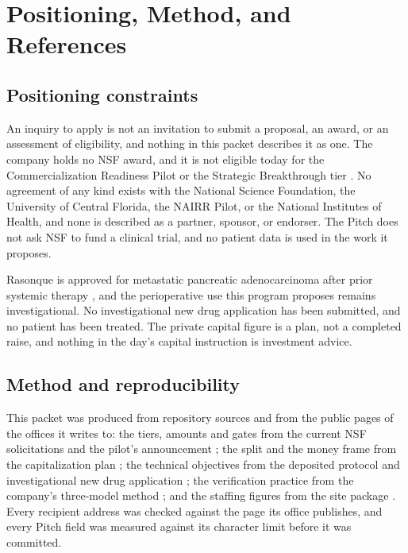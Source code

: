 \section{Positioning, Method, and References}

\subsection{Positioning constraints}

An inquiry to apply is not an invitation to submit a proposal, an award, or an
assessment of eligibility, and nothing in this packet describes it as one. The
company holds no NSF award, and it is not eligible today for the
Commercialization Readiness Pilot or the Strategic Breakthrough tier
\cite{nsfncti2026,nsf26510}. No agreement of any kind exists with the National
Science Foundation, the University of Central Florida, the NAIRR Pilot, or the
National Institutes of Health, and none is described as a partner, sponsor, or
endorser. The Pitch does not ask NSF to fund a clinical trial, and no patient
data is used in the work it proposes.

Rasonque is approved for metastatic pancreatic adenocarcinoma after prior
systemic therapy \cite{fdarasonque2026}, and the perioperative use this program
proposes remains investigational. No investigational new drug application has
been submitted, and no patient has been treated. The private capital figure is
a plan, not a completed raise, and nothing in the day's capital instruction is
investment advice.

\subsection{Method and reproducibility}

This packet was produced from repository sources and from the public pages of
the offices it writes to: the tiers, amounts and gates from the current NSF
solicitations and the pilot's announcement \cite{nsf26510,nsf26511,nsfncti2026};
the split and the money frame from the capitalization plan
\cite{capitalplan2026}; the technical objectives from the deposited protocol and
investigational new drug application \cite{onpremwhippl,phase1ind}; the
verification practice from the company's three-model method
\cite{tripartisan2026}; and the staffing figures from the site package
\cite{movein2026}. Every recipient address was checked against the page its
office publishes, and every Pitch field was measured against its character limit
before it was committed.

